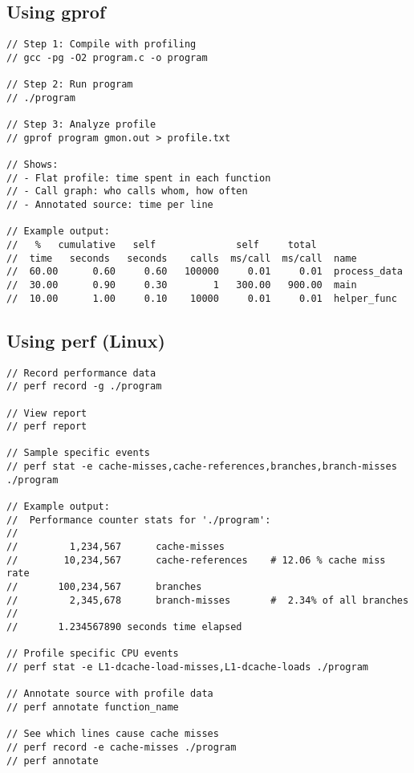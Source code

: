 \subsection{Using gprof}

\begin{lstlisting}
// Step 1: Compile with profiling
// gcc -pg -O2 program.c -o program

// Step 2: Run program
// ./program

// Step 3: Analyze profile
// gprof program gmon.out > profile.txt

// Shows:
// - Flat profile: time spent in each function
// - Call graph: who calls whom, how often
// - Annotated source: time per line

// Example output:
//   %   cumulative   self              self     total
//  time   seconds   seconds    calls  ms/call  ms/call  name
//  60.00      0.60     0.60   100000     0.01     0.01  process_data
//  30.00      0.90     0.30        1   300.00   900.00  main
//  10.00      1.00     0.10    10000     0.01     0.01  helper_func
\end{lstlisting}

\subsection{Using perf (Linux)}

\begin{lstlisting}
// Record performance data
// perf record -g ./program

// View report
// perf report

// Sample specific events
// perf stat -e cache-misses,cache-references,branches,branch-misses ./program

// Example output:
//  Performance counter stats for './program':
//
//         1,234,567      cache-misses
//        10,234,567      cache-references    # 12.06 % cache miss rate
//       100,234,567      branches
//         2,345,678      branch-misses       #  2.34% of all branches
//
//       1.234567890 seconds time elapsed

// Profile specific CPU events
// perf stat -e L1-dcache-load-misses,L1-dcache-loads ./program

// Annotate source with profile data
// perf annotate function_name

// See which lines cause cache misses
// perf record -e cache-misses ./program
// perf annotate
\end{lstlisting}

